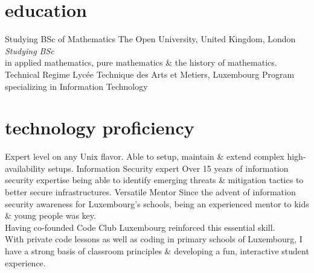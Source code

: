 \documentclass[]{friggeri-cv} %
\begin{document}
\newpage


\section{education}
\begin{entrylist}
{Studying BSc {\normalfont of Mathematics}}
{The Open University, United Kingdom, London}
{\emph{Studying BSc} \\ in applied mathematics, pure mathematics \& the history of mathematics.}
{Technical Regime}
{Lyc\'{e}e Technique des Arts et Metiers, Luxembourg}
{Program specializing in Information Technology}
\end{entrylist}


\section{technology proficiency}

\begin{entrylist}
{}
{Expert level on any Unix flavor. Able to setup, maintain \& extend complex high-availability setups.}
{Information Security expert}
{}
{Over 15 years of information security expertise being able to identify emerging threats \& mitigation tactics to better secure infrastructures.}
{Versatile Mentor}
{}
{Since the advent of information security awareness for Luxembourg's schools, being an experienced mentor to kids \& young people was key. \\
Having co-founded Code Club Luxembourg reinforced this essential skill. \\
With private code lessons as well as coding in primary schools of Luxembourg, I have a strong basis of classroom principles \& developing a fun, interactive student experience.}
\end{entrylist}
\end{document}
